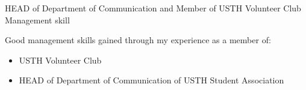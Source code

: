 \begin{cventries}
  \cventry
    {HEAD of Department of Communication and Member of USTH Volunteer Club} %
    {Management skill} %
    { } %
    { } %
    {
      \begin{cvitems} %
        \item {Good management skills gained through my experience as a member of:
        \begin{itemize}
            \item USTH Volunteer Club
            \item HEAD of Department of Communication of USTH Student Association
        \end{itemize}}
      \end{cvitems}
    }

\end{cventries}
